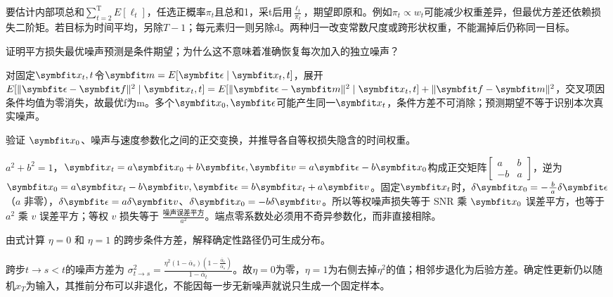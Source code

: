 \begin{exercises}
\begin{exercise}
\begin{solution}
要估计内部项总和$\sum_{t=2}^{\mathrm{T}}E[\ell_t]$，任选正概率$\pi_t$且总和1，采t后用$\frac{\ell_t}{\pi_t}$，期望即原和。例如$\pi_t\propto w_t$可能减少权重差异，但最优方差还依赖损失二阶矩。若目标为时间平均，另除$T-1$；每元素归一则另除d。两种归一改变常数尺度或跨形状权重，不能漏掉后仍称同一目标。
\end{solution}
\end{exercise}

\begin{exercise} 证明平方损失最优噪声预测是条件期望；为什么这不意味着准确恢复每次加入的独立噪声？

\begin{solution}
对固定$\vect{x}_t,t$令$\vect{m}=E[\vect{\epsilon}\mid \vect{x}_t,t]$，展开 $E[\|\vect{\epsilon}-\vect{f}\|^2\mid \vect{x}_t,t]=E[\|\vect{\epsilon}-\vect{m}\|^2\mid \vect{x}_t,t]+\|\vect{f}-\vect{m}\|^2$，交叉项因条件均值为零消失，故最优f为m。多个$\vect{x}_0,\vect{\epsilon}$可能产生同一$\vect{x}_t$，条件方差不可消除；预测期望不等于识别本次真实噪声。
\end{solution}
\end{exercise}

\begin{exercise} 验证 $\vect{x}_0$、噪声与速度参数化之间的正交变换，并推导各自等权损失隐含的时间权重。

\begin{solution}
$a^2+b^2=1$，$\vect{x}_t=a\vect{x}_0+b\vect{\epsilon},\vect{v}=a\vect{\epsilon}-b\vect{x}_0$构成正交矩阵$\left[\begin{smallmatrix}a&b\\-b&a\end{smallmatrix}\right]$，逆为$\vect{x}_0=a\vect{x}_t-b\vect{v},\vect{\epsilon}=b\vect{x}_t+a\vect{v}$。固定$\vect{x}_t$时，$\delta \vect{x}_0=-\frac{b}{a}\delta\vect{\epsilon}$（$a$ 非零），$\delta\vect{\epsilon}=a\delta \vect{v}$、$\delta \vect{x}_0=-b\delta \vect{v}$。所以等权噪声损失等于 SNR 乘 $\vect{x}_0$ 误差平方，也等于 $a^2$ 乘 $v$ 误差平方；等权 $v$ 损失等于 $\frac{\text{噪声误差平方}}{a^2}$。端点零系数处必须用不奇异参数化，而非直接相除。
\end{solution}
\end{exercise}

\begin{exercise} 由式计算 $\eta=0$ 和 $\eta=1$ 的跨步条件方差，解释确定性路径仍可生成分布。

\begin{solution}
跨步$t\to s<t$的噪声方差为 $\sigma_{t\to s}^2=\frac{\eta^2(1-\bar\alpha_s)(1-\frac{\bar\alpha_t}{\bar\alpha_s})}{1-\bar\alpha_t}$。故$\eta=0$为零，$\eta=1$为右侧去掉$\eta^2$的值；相邻步退化为后验方差。确定性更新仍以随机$x_T$为输入，其推前分布可以非退化，不能因每一步无新噪声就说只生成一个固定样本。
\end{solution}
\end{exercise}


\end{exercises}
